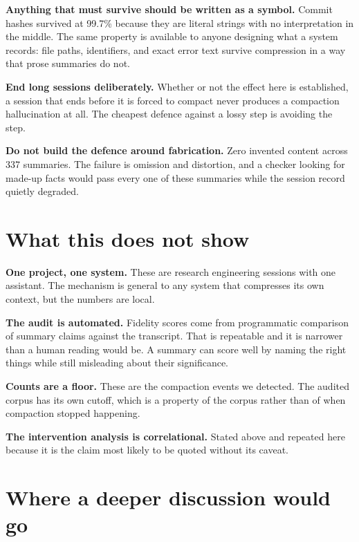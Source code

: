 \documentclass[11pt]{article}
\begin{document}
\textbf{Anything that must survive should be written as a symbol.} Commit hashes
survived at 99.7\% because they are literal strings with no interpretation in the
middle. The same property is available to anyone designing what a system records:
file paths, identifiers, and exact error text survive compression in a way that
prose summaries do not.

\textbf{End long sessions deliberately.} Whether or not the effect here is
established, a session that ends before it is forced to compact never produces a
compaction hallucination at all. The cheapest defence against a lossy step is
avoiding the step.

\textbf{Do not build the defence around fabrication.} Zero invented content
across 337 summaries. The failure is omission and distortion, and a checker
looking for made-up facts would pass every one of these summaries while the
session record quietly degraded.

\section{What this does not show}

\textbf{One project, one system.} These are research engineering sessions with
one assistant. The mechanism is general to any system that compresses its own
context, but the numbers are local.

\textbf{The audit is automated.} Fidelity scores come from programmatic
comparison of summary claims against the transcript. That is repeatable and it is
narrower than a human reading would be. A summary can score well by naming the
right things while still misleading about their significance.

\textbf{Counts are a floor.} These are the compaction events we detected. The
audited corpus has its own cutoff, which is a property of the corpus rather than
of when compaction stopped happening.

\textbf{The intervention analysis is correlational.} Stated above and repeated
here because it is the claim most likely to be quoted without its caveat.

\section{Where a deeper discussion would go}
\end{document}
